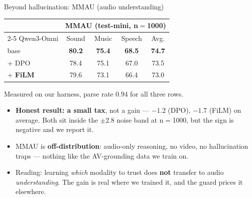 \documentclass[aspectratio=169,11pt]{beamer}
\begin{document}
\begin{frame}{Beyond hallucination: MMAU (audio understanding)}
\centering\small
\renewcommand{\arraystretch}{1.2}
\begin{tabular}{l cccc}
\toprule
 & \multicolumn{4}{c}{MMAU (test-mini, n$=$1000)} \\
\cmidrule(lr){2-5}
Qwen3-Omni & Sound & Music & Speech & Avg. \\
\midrule
base                   & \textbf{80.2} & \textbf{75.4} & \textbf{68.5} & \textbf{74.7} \\ %
\quad + DPO            & 78.4 & 75.1 & 67.0 & 73.5 \\ %
\quad + \textbf{FiLM}  & 79.6 & 73.1 & 66.4 & 73.0 \\ %
\bottomrule
\end{tabular}
\par\vspace{0.3em}
{\scriptsize Measured on our harness, parse rate $0.94$ for all three rows.}
\vfill
\begin{itemize}\small
\item \textbf{Honest result: a small tax}, not a gain --- $-1.2$ (DPO), $-1.7$ (FiLM) on average.
Both sit inside the $\pm2.8$ noise band at n$=$1000, but the sign is negative and we report it.
\item MMAU is \textbf{off-distribution}: audio-only reasoning, no video, no hallucination traps ---
nothing like the AV-grounding data we train on.
\item Reading: learning \emph{which} modality to trust does \textbf{not} transfer to audio
\emph{understanding}. The gain is real where we trained it, and the guard prices it elsewhere.
\end{itemize}
\end{frame}
\end{document}
